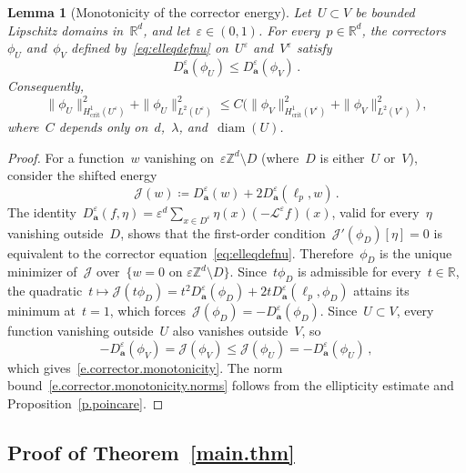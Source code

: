 \documentclass[11pt]{amsart}
\theoremstyle{plain}
\newtheorem{lemma}[theorem]{Lemma}
\theoremstyle{definition}
\theoremstyle{remark}
\newcommand{\Zd}{\mathbb{Z}^d}
\newcommand{\Rd}{\mathbb{R}^d}
\newcommand{\R}{\mathbb{R}}
\renewcommand{\a}{\mathbf{a}}
\newcommand{\eps}{\varepsilon}
\begin{document}
	\begin{lemma}[Monotonicity of the corrector energy]
		\label{l.corrector.monotonicity}
		Let~$U \subset V$ be bounded Lipschitz domains in~$\Rd$, and let~$\eps \in (0,1)$.
		For every~$p \in \Rd$, the correctors~$\phi_U$ and~$\phi_V$ defined by~\eqref{eq:elleqdefnu} on~$U^\eps$ and~$V^\eps$ satisfy
		\begin{equation}
			\label{e.corrector.monotonicity}
			D_\a^\eps(\phi_U) \le D_\a^\eps(\phi_V)\,.
		\end{equation}
		Consequently,
		\begin{equation}
			\label{e.corrector.monotonicity.norms}
			\|\phi_U\|_{H^1_{\mathrm{crit}}(U^\eps)}^2 + \|\phi_U\|_{L^2(U^\eps)}^2
			\le C\bigl(\|\phi_V\|_{H^1_{\mathrm{crit}}(V^\eps)}^2 + \|\phi_V\|_{L^2(V^\eps)}^2\bigr)\,,
		\end{equation}
		where~$C$ depends only on~$d$,~$\lambda$, and~$\operatorname{diam}(U)$.
	\end{lemma}
	
	\begin{proof}
		For a function~$w$ vanishing on~$\eps\Zd \setminus D$ (where~$D$ is either~$U$ or~$V$), consider the shifted energy
		\[
		\mathcal{J}(w) \coloneqq D_\a^\eps(w) + 2D_\a^\eps(\ell_p, w)\,.
		\]
		The identity~$D_\a^\eps(f, \eta) = \eps^d\sum_{x \in D^\eps}\eta(x)(-\mathcal{L}^\eps f)(x)$, valid for every~$\eta$ vanishing outside~$D$, shows that the first-order condition~$\mathcal{J}'(\phi_D)[\eta] = 0$ is equivalent to the corrector equation~\eqref{eq:elleqdefnu}.
		Therefore~$\phi_D$ is the unique minimizer of~$\mathcal{J}$ over~$\{w = 0 \text{ on } \eps\Zd \setminus D\}$.
		Since~$t\phi_D$ is admissible for every~$t \in \R$, the quadratic~$t \mapsto \mathcal{J}(t\phi_D) = t^2 D_\a^\eps(\phi_D) + 2t D_\a^\eps(\ell_p, \phi_D)$ attains its minimum at~$t = 1$, which forces~$\mathcal{J}(\phi_D) = -D_\a^\eps(\phi_D)$.
		Since~$U \subset V$, every function vanishing outside~$U$ also vanishes outside~$V$, so
		\[
		-D_\a^\eps(\phi_V) = \mathcal{J}(\phi_V) \le \mathcal{J}(\phi_U) = -D_\a^\eps(\phi_U)\,,
		\]
		which gives~\eqref{e.corrector.monotonicity}.
		The norm bound~\eqref{e.corrector.monotonicity.norms} follows from the ellipticity estimate and Proposition~\ref{p.poincare}.
	\end{proof}
	
	\subsection{Proof of Theorem~\ref{main.thm}}
	
\end{document}

